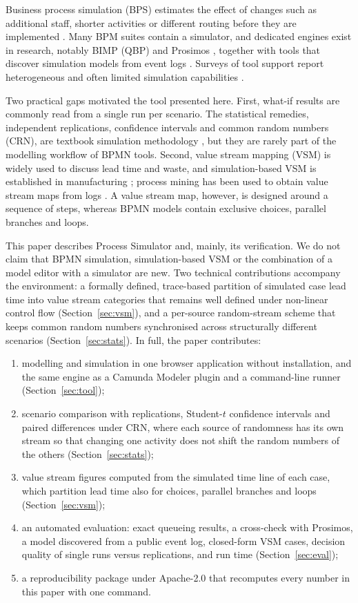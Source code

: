 \documentclass[preprint,12pt,nonatbib]{elsarticle}
\newcommand{\tool}{Process Simulator}
\begin{document}
Business process simulation (BPS) estimates the effect of changes such as additional staff, shorter activities or different routing before they are implemented \citep{vanderaalst2015,dumas2018}. Many BPM suites contain a simulator, and dedicated engines exist in research, notably BIMP (QBP) and Prosimos \citep{lopezpintado2022,lopezpintado2024}, together with tools that discover simulation models from event logs \citep{rozinat2009,camargo2020}. Surveys of tool support report heterogeneous and often limited simulation capabilities \citep{pereira2016,rosenthal2021,laue2016}.

Two practical gaps motivated the tool presented here. First, what-if results are commonly read from a single run per scenario. The statistical remedies, independent replications, confidence intervals and common random numbers (CRN), are textbook simulation methodology \citep{law2015,nelson1995,kim2001}, but they are rarely part of the modelling workflow of BPMN tools. Second, value stream mapping (VSM) \citep{rother1999} is widely used to discuss lead time and waste, and simulation-based VSM is established in manufacturing \citep{lian2007,solding2009}; process mining has been used to obtain value stream maps from logs \citep{knoll2019}. A value stream map, however, is designed around a sequence of steps, whereas BPMN models contain exclusive choices, parallel branches and loops.

This paper describes \tool{} and, mainly, its verification. We do not claim that BPMN simulation, simulation-based VSM or the combination of a model editor with a simulator are new. Two technical contributions accompany the environment: a formally defined, trace-based partition of simulated case lead time into value stream categories that remains well defined under non-linear control flow (Section~\ref{sec:vsm}), and a per-source random-stream scheme that keeps common random numbers synchronised across structurally different scenarios (Section~\ref{sec:stats}). In full, the paper contributes:
\begin{enumerate}
\item modelling and simulation in one browser application without installation, and the same engine as a Camunda Modeler plugin and a command-line runner (Section~\ref{sec:tool});
\item scenario comparison with replications, Student-$t$ confidence intervals and paired differences under CRN, where each source of randomness has its own stream so that changing one activity does not shift the random numbers of the others (Section~\ref{sec:stats});
\item value stream figures computed from the simulated time line of each case, which partition lead time also for choices, parallel branches and loops (Section~\ref{sec:vsm});
\item an automated evaluation: exact queueing results, a cross-check with Prosimos, a model discovered from a public event log, closed-form VSM cases, decision quality of single runs versus replications, and run time (Section~\ref{sec:eval});
\item a reproducibility package under Apache-2.0 that recomputes every number in this paper with one command.
\end{enumerate}
\end{document}
